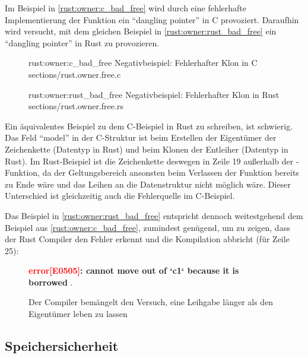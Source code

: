 Im Beispiel in \autoref{rust:owner:c_bad_free} wird durch eine fehlerhafte Implementierung der Funktion  ein \enquote{dangling pointer} in C provoziert.
Daraufhin wird versucht, mit dem gleichen Beispiel in \autoref{rust:owner:rust_bad_free} ein \enquote{dangling pointer} in Rust zu provozieren.



\begin{figure}[H]
	\ccinclude
	{rust:owner:c_bad_free}
	{Negativbeispiel: Fehlerhafter Klon in C}
	{sections/rust.owner.free.c}
\end{figure}

\begin{figure}[H]
	\rustcinclude
	{rust:owner:rust_bad_free}
	{Negativbeispiel: Fehlerhafter Klon in Rust}
	{sections/rust.owner.free.rs}
\end{figure}

Ein äquivalentes Beispiel zu dem C-Beispiel in Rust zu schreiben, ist schwierig.
Das Feld \enquote{model} in der C-Struktur ist beim Erstellen der Eigentümer der Zeichenkette (Datentyp  in Rust) und beim Klonen der Entleiher (Datentyp  in Rust).
Im Rust-Beispiel ist die Zeichenkette deswegen in Zeile 19 außerhalb der -Funktion, da der Geltungsbereich ansonsten beim Verlassen der Funktion bereits zu Ende wäre und das Leihen an die Datenstruktur nicht möglich wäre.
Dieser Unterschied ist gleichzeitig auch die Fehlerquelle im C-Beispiel.

Das Beispiel in \autoref{rust:owner:rust_bad_free} entspricht dennoch weitestgehend dem Beispiel aus \autoref{rust:owner:c_bad_free}, zumindest genügend, um zu zeigen, dass der Rust Compiler den Fehler erkennt und die Kompilation abbricht (für Zeile 25):

\begin{figure}[H]
	\begin{tcolorbox}[colback=codeBackground,boxrule=0pt,arc=0pt]
		\begin{scriptsize}
			\textbf{\textcolor{red}{error[E0505]}: cannot move out of `c1` because it is borrowed} .
		\end{scriptsize}
	\end{tcolorbox}
	\caption{Der Compiler bemängelt den Versuch, eine Leihgabe länger als den Eigentümer leben zu lassen}
	\label{rust:rustc:error:no_dangling_pointer}
\end{figure}


\subsection{Speichersicherheit}
\label{rust:guarantee:memory_safety}


